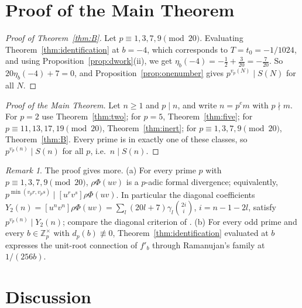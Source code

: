 \documentclass[11pt]{amsart}
\theoremstyle{definition}
\theoremstyle{remark}
\newtheorem{remark}[theorem]{Remark}
\newcommand{\Zp}{\mathbb{Z}_p}
\begin{document}
\section{Proof of the Main Theorem}\label{sec:main}

\begin{proof}[Proof of Theorem~\ref{thm:B}]
Let $p\equiv1,3,7,9\pmod{20}$. Evaluating Theorem~\ref{thm:identification} at $b=-4$, which
corresponds to $T=t_0=-1/1024$, and using Proposition~\ref{prop:dwork}(ii), we get
$\eta_b(-4)=-\frac12+\frac3{20}=-\frac7{20}$. So $20\eta_b(-4)+7=0$, and
Proposition~\ref{prop:onenumber} gives $p^{v_p(N)}\mid S(N)$ for all $N$.
\end{proof}

\begin{proof}[Proof of the Main Theorem]
Let $n\ge1$ and $p\mid n$, and write $n=p^em$ with $p\nmid m$. For $p=2$ use
Theorem~\ref{thm:two}; for $p=5$, Theorem~\ref{thm:five}; for $p\equiv11,13,17,19\pmod{20}$,
Theorem~\ref{thm:inert}; for $p\equiv1,3,7,9\pmod{20}$, Theorem~\ref{thm:B}. Every prime is in
exactly one of these classes, so $p^{v_p(n)}\mid S(n)$ for all $p$, i.e.\ $n\mid S(n)$.
\end{proof}

\begin{remark}
The proof gives more. (a) For every prime $p$ with $p\equiv1,3,7,9\pmod{20}$, $\rho\Phi(uv)$ is a
$p$-adic formal divergence; equivalently,
$p^{\min(v_pr,v_ps)}\mid[u^rv^s]\rho\Phi(uv)$. In particular the diagonal coefficients
$Y_2(n)=[u^nv^n]\rho\Phi(uv)=\sum_l(20l+7)\gamma_l\binom{2i}i$, $i=n-1-2l$, satisfy
$p^{v_p(n)}\mid Y_2(n)$; compare the diagonal criterion of \cite[\S8]{K26}. (b) For every odd prime and every
$b\in\Zp^\times$ with $d_p(b)\not\equiv0$, Theorem~\ref{thm:identification} evaluated at $b$
expresses the unit-root connection of $f'_b$ through Ramanujan's family at $1/(256b)$.
\end{remark}

\section{Discussion}\label{sec:discussion}
\end{document}
